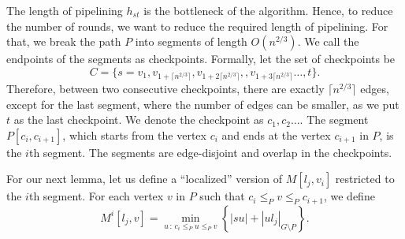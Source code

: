 The length of pipelining $h_{st}$ is the bottleneck of the algorithm. Hence, to reduce the number of rounds, we want to reduce the required length of pipelining. For that, we break the path $P$ into segments of length $O(n^{2/3})$. We call the endpoints of the segments as checkpoints. Formally, %
let the set of checkpoints be \[C=\{s=v_1,v_{1+\lceil n^{2/3} \rceil},v_{1+2\lceil n^{2/3} \rceil},,v_{1+3\lceil n^{2/3} \rceil} \ldots, t\}.\] 
Therefore, between two consecutive checkpoints, there are exactly $\lceil n^{2/3} \rceil$ edges, except for the last segment, where the number of edges can be smaller, as we put $t$ as the last checkpoint.
We denote the checkpoint as $c_1, c_2 \ldots$. The segment $P[c_{i},c_{i+1}]$, which starts from the vertex $c_{i}$ and ends at the vertex $c_{i+1}$ in $P$, is the $i$th segment. The segments are edge-disjoint and overlap in the checkpoints. %

For our next lemma, let us define a ``localized'' version of $M[l_j,v_i]$ restricted to the $i$th segment. For each vertex $v$ in $P$ such that $c_{i} \leq_P v \leq_P c_{i+1}$, we define \[M^i[l_j,v]=\min_{u \, : \, c_{i} \leq_P u \leq_P  v} \left\{|su|+|ul_j|_{G \setminus P}\right\}.\] 





%









